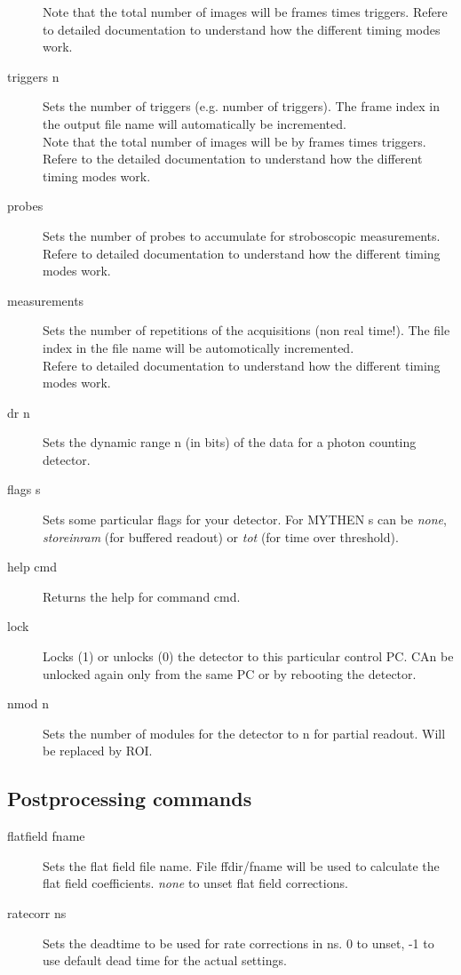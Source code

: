 \documentclass{article}
\begin{document}
\begin{description}
Note that the total number of images will be  frames times triggers.  Refere to detailed documentation to understand how the different timing modes work. 
\item[triggers n] 
Sets the number of triggers (e.g. number of triggers). The frame index in the output file name will automatically be incremented. \\ 
Note that the total number of images will be by frames times triggers.   Refere to the detailed documentation to understand how the different timing modes work.
\item[probes]  Sets the number of probes to accumulate for stroboscopic measurements. \\
Refere to detailed documentation to understand how the different timing modes work.
\item[measurements] Sets the number of repetitions of the acquisitions (non real time!). The file index in the file name will be automotically incremented.\\
Refere to detailed documentation to understand how the different timing modes work.
\item[dr n] Sets the dynamic range n (in bits) of the data for a photon counting detector. 
\item[flags s] Sets some particular flags for your detector. For MYTHEN s can be \textit{none}, \textit{storeinram} (for buffered readout) or \textit{tot} (for time over threshold). 
\item[help cmd]  Returns the help for command cmd.
\item[lock] Locks (1) or unlocks (0) the detector to this particular control PC. CAn be unlocked again only from the same PC or by rebooting the detector.
\item[nmod n] Sets the number of modules for the detector to n for partial readout. Will be replaced by ROI.
\end{description}








\subsection{Postprocessing commands}
\begin{description}      
\item[flatfield fname] Sets the flat field file name. File ffdir/fname will be used to calculate the flat field coefficients. \textit{none} to unset flat field corrections. 
\item[ratecorr ns] Sets the deadtime to be used for rate corrections in ns. 0 to unset, -1 to use default dead time for the actual settings.
\end{description}
\end{document}
